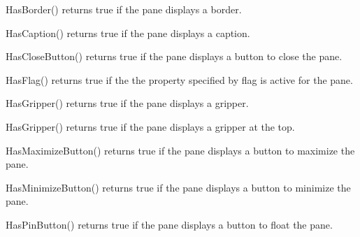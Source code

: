 
HasBorder() returns true if the pane displays a border.

\label{wxauipaneinfohascaption}


HasCaption() returns true if the pane displays a caption.

\label{wxauipaneinfohasclosebutton}


HasCloseButton() returns true if the pane displays a button to close the pane.

\label{wxauipaneinfohasflag}


HasFlag() returns true if the the property specified by flag is active for the pane.

\label{wxauipaneinfohasgripper}


HasGripper() returns true if the pane displays a gripper.

\label{wxauipaneinfohasgrippertop}


HasGripper() returns true if the pane displays a gripper at the top.

\label{wxauipaneinfohasmaximizebutton}


HasMaximizeButton() returns true if the pane displays a button to maximize the pane.

\label{wxauipaneinfohasminimizebutton}


HasMinimizeButton() returns true if the pane displays a button to minimize the pane.

\label{wxauipaneinfohaspinbutton}


HasPinButton() returns true if the pane displays a button to float the pane.

